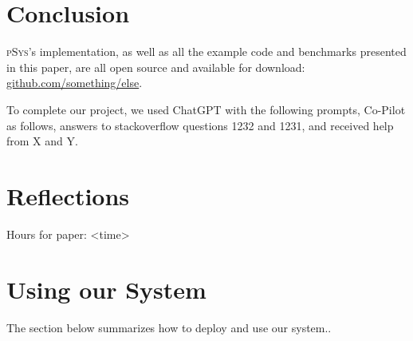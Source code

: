 \documentclass[sigplan, review, screen, 10pt]{acmart}
\newcommand{\sys}{{\scshape pSys}\xspace}
\begin{document}
\section{Conclusion}
\label{conclusion}

\sys's implementation, as well as all the example code and benchmarks presented in this paper, are all open source and available for download:
\href{https://github.com/something/else}{github.com/something/else}.

\begin{acks}
To complete our project, we used ChatGPT with the following prompts, Co-Pilot as follows, answers to stackoverflow questions 1232 and 1231, and received help from X and Y.
\end{acks}

{\small

}

\appendix

\section{Reflections}
\label{reflections}



Hours for paper: <time>

\section{Using our System}
\label{using-apx}

The section below summarizes how to deploy and use our system..
\end{document}
